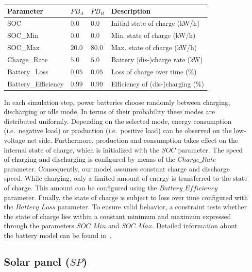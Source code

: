 \begin{table}[h]
	\renewcommand{\arraystretch}{1.3}
	\centering
	\begin{tabularx}{\columnwidth}{lllX}
		\hline
		\textbf{Parameter}     & \textbf{$PB_{A}$} & \textbf{$PB_{B}$} & \textbf{Description} \\ \hline
		SOC                     & $0.0$ & $0.0$ & Initial state of charge (kW/h)                   \\
		SOC\_Min                & $0.0$ & $0.0$ & Min. state of charge (kW/h)                   \\
		SOC\_Max               & $20.0$ & $80.0$ &  Max. state of charge (kW/h)                    \\
		Charge\_Rate            & $5.0$ & $5.0$ & Battery (dis-)charge rate (kW)     \\ 
		Battery\_Loss           & $0.05$ & $0.05$ & Loss of charge over time (\%)\\
		Battery\_Efficiency      & $0.99$ & $0.99$ &Efficiency of (dis-)charging (\%)     \\ \hline
	\end{tabularx}
\end{table}

In each simulation step, power batteries choose randomly between charging, discharging or idle mode. In terms of their probability these modes are distributed uniformly. Depending on the selected mode, energy consumption (i.e.\ negative load) or production (i.e.\ positive load) can be observed on the low-voltage net side. Furthermore, production and consumption takes effect on the internal state of charge, which is initialized with the $SOC$ parameter. The speed of charging and discharging is configured by means of the $Charge\_Rate$ parameter. Consequently, our model assumes constant charge and discharge speed. While charging, only a limited amount of energy is transferred to the state of charge. This amount can be configured using the $Battery\_Efficiency$ parameter. Finally, the state of charge is subject to loss over time configured with the $Battery\_Loss$ parameter. To ensure valid behavior, a constraint tests whether the state of charge lies within a constant minimum and maximum expressed through the parameters $SOC\_Min$ and $SOC\_Max$. Detailed information about the battery model can be found in~\cite{hackenberg2014rapid}.

\subsection{Solar panel ($SP$)}

